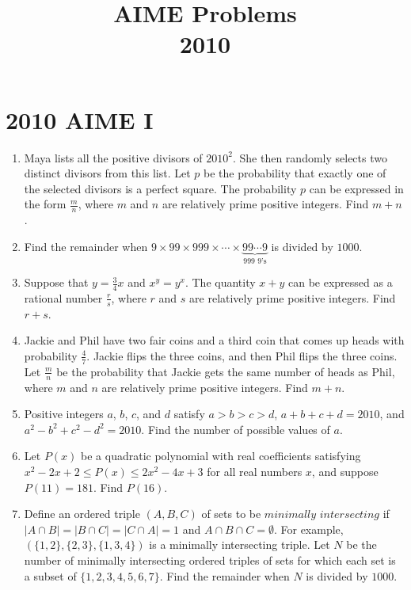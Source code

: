 \documentclass{article}
\title{AIME Problems \\ 2010}
\date{}
\begin{document}
\maketitle\thispagestyle{fancy}\newpage\section*{2010 AIME I}
\begin{enumerate}[label=\arabic*., itemsep=0.5em]
\item Maya lists all the positive divisors of \(2010^2\). She then randomly selects two distinct divisors from this list. Let \(p\) be the probability that exactly one of the selected divisors is a perfect square. The probability \(p\) can be expressed in the form \(\frac {m}{n}\), where \(m\) and \(n\) are relatively prime positive integers. Find \(m + n\).\par \vspace{0.5em}\item Find the remainder when \(9 \times 99 \times 999 \times \cdots \times \underbrace{99\cdots9}_{\text{999 9's}}\) is divided by \(1000\).\par \vspace{0.5em}\item Suppose that \(y = \frac34x\) and \(x^y = y^x\). The quantity \(x + y\) can be expressed as a rational number \(\frac {r}{s}\), where \(r\) and \(s\) are relatively prime positive integers. Find \(r + s\).\par \vspace{0.5em}\item Jackie and Phil have two fair coins and a third coin that comes up heads with probability \(\frac47\). Jackie flips the three coins, and then Phil flips the three coins. Let \(\frac {m}{n}\) be the probability that Jackie gets the same number of heads as Phil, where \(m\) and \(n\) are relatively prime positive integers. Find \(m + n\).\par \vspace{0.5em}\item Positive integers \(a\), \(b\), \(c\), and \(d\) satisfy \(a > b > c > d\), \(a + b + c + d = 2010\), and \(a^2 - b^2 + c^2 - d^2 = 2010\). Find the number of possible values of \(a\).\par \vspace{0.5em}\item Let \(P(x)\) be a quadratic polynomial with real coefficients satisfying \(x^2 - 2x + 2 \le P(x) \le 2x^2 - 4x + 3\) for all real  numbers \(x\), and suppose \(P(11) = 181\). Find \(P(16)\).\par \vspace{0.5em}\item Define an ordered triple \((A, B, C)\) of sets to be \(\textit{minimally intersecting}\) if \(|A \cap B| = |B \cap C| = |C \cap A| = 1\) and \(A \cap B \cap C = \emptyset\). For example, \((\{1,2\},\{2,3\},\{1,3,4\})\) is a minimally intersecting triple. Let \(N\) be the number of minimally intersecting ordered triples of sets for which each set is a subset of \(\{1,2,3,4,5,6,7\}\). Find the remainder when \(N\) is divided by \(1000\).


\end{enumerate}
\end{document}
